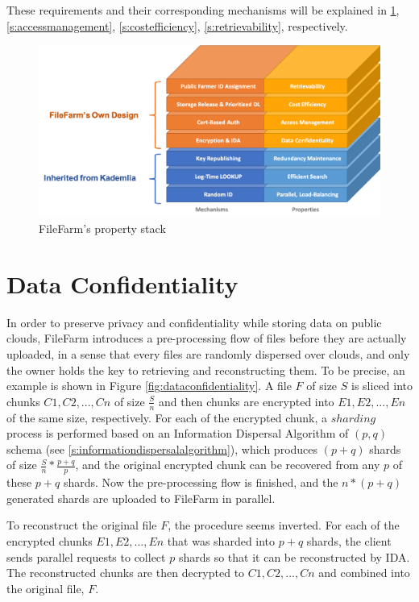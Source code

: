 \noindent These requirements and their corresponding mechanisms will be explained in \ref{s:dataconfidentiality}, \ref{s:accessmanagement}, \ref{s:costefficiency}, \ref{s:retrievability}, respectively.

\begin{figure}[hbt]
\centering
  \includegraphics[width=14cm]{figures/property_stack.png}
  \caption{FileFarm's property stack}
  \label{fig:propertystack}
\end{figure}

\newpage

\section{Data Confidentiality}
\label{s:dataconfidentiality}

In order to preserve privacy and confidentiality while storing data on public clouds, FileFarm introduces a pre-processing flow of files before they are actually uploaded, in a sense that every files are randomly dispersed over clouds, and only the owner holds the key to retrieving and reconstructing them. To be precise, an example is shown in Figure \ref{fig:dataconfidentiality}. A file $F$ of size $S$ is sliced into chunks $C1, C2, ..., Cn$ of size $\frac{S}{n}$ and then chunks are encrypted into $E1, E2, ..., En$ of the same size, respectively. For each of the encrypted chunk, a $sharding$ process is performed based on an Information Dispersal Algorithm of $(p,q)$ schema (see \ref{s:informationdispersalalgorithm}), which produces $(p+q)$ shards of size $\frac{S}{n}*\frac{p+q}{p}$, and the original encrypted chunk can be recovered from any $p$ of these $p+q$ shards. Now the pre-processing flow is finished, and the $n*(p+q)$ generated shards are uploaded to FileFarm in parallel.

To reconstruct the original file $F$, the procedure seems inverted. For each of the encrypted chunks $E1, E2, ..., En$ that was sharded into $p+q$ shards, the client sends parallel requests to collect $p$ shards so that it can be reconstructed by IDA. The reconstructed chunks are then decrypted to $C1, C2, ..., Cn$ and combined into the original file, $F$.

